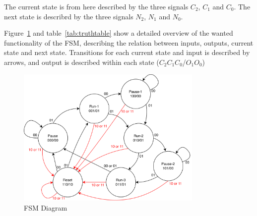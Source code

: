 The current state is from here described by the three signals $C_2$, $C_1$ and $C_0$. The next state is describrd by the three signals $N_2$, $N_1$ and $N_0$.

Figure~\ref{fig:fsm_diagram} and table~\ref{tab:truthtable} show a detailed overview of the wanted functionality of the FSM, describing the relation between inputs, outputs, current state and next state. Transitions for each current state and input is described by arrows, and output is described within each state ($C_2 C_1 C_0$/$O_1 O_0$)

\begin{figure}[H]
    \centering
    \includegraphics[width=0.8\textwidth]{Figures/FSM-diagram.png}
    \caption{FSM Diagram}
    \label{fig:fsm_diagram}
\end{figure}

